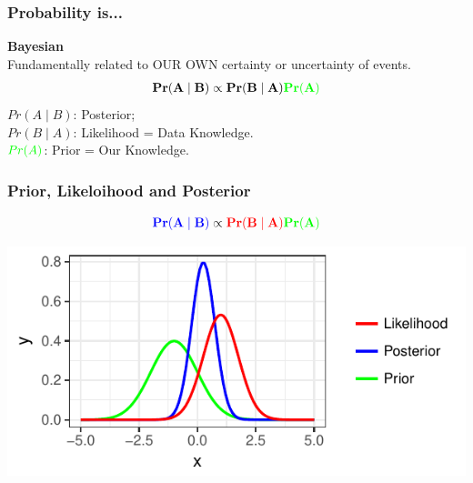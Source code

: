 \documentclass[handout]{beamer}\usepackage[]{graphicx}\usepackage[]{color}
\makeatletter
\def\maxwidth{ %
  \ifdim\Gin@nat@width>\linewidth
    \linewidth
  \else
    \Gin@nat@width
  \fi
}
\newenvironment{knitrout}{}{} %
\makeatother
\begin{document}

\begin{frame}
\frametitle{Probability is...}
\pause
{\Large \textbf{Bayesian}} \\
\vskip 1cm
\pause
Fundamentally related to {\color{green} OUR OWN} certainty or uncertainty of events.
\pause
\begin{align*}
\mathbf{Pr(A \mid B) \propto Pr(B \mid A) {\color{green} Pr(A)} }
\end{align*}
$Pr(A \mid B)$: Posterior; \\
$Pr(B \mid A)$: Likelihood = Data Knowledge. \\
${\color{green} Pr(A)}$: Prior = Our Knowledge.

\end{frame}

\begin{frame}
\frametitle{Prior, Likeloihood and Posterior}
\pause
\begin{align*}
\mathbf{{\color{blue} Pr(A \mid B)} \propto \color{red} {Pr(B \mid A) } {\color{green} Pr(A)} }
\end{align*}
\pause


\begin{knitrout}
\color{fgcolor}
\includegraphics[width=\maxwidth]{figure/bayes-1} 

\end{knitrout}

\end{frame}

\end{document}
